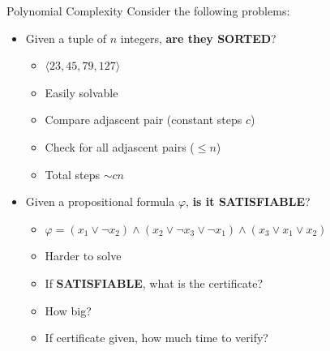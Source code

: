 \documentclass[usenames,dvipsnames]{beamer}
\newcommand\ldiaarg[1]{\langle#1\rangle}
\begin{document}
\begin{frame}{Polynomial Complexity}
    Consider the following problems:
    \begin{itemize}
        \item<1-> Given a tuple of $n$ integers, \textbf{are they SORTED}?
        \begin{itemize}
            \item<2-> $\ldiaarg{23,45,79,127}$
            \item<3-> Easily solvable
            \item<4-> Compare adjascent pair (constant steps $c$)
            \item<5-> Check for all adjascent pairs ($\leq n$)
            \item<6-> Total steps $\sim cn$
        \end{itemize}
        \item<7-> Given a propositional formula $\varphi$, \textbf{is it SATISFIABLE}?
        \begin{itemize}
            \item<8-> $\varphi = (x_1\vee \neg x_2)\wedge (x_2\vee \neg x_3\vee \neg x_1)\wedge (x_3\vee x_1\vee x_2)$
            \item<9-> Harder to solve
            \item<10-> If \textbf{SATISFIABLE}, what is the certificate?
            \item<11-> How big?
            \item<12-> If certificate given, how much time to verify?
        \end{itemize}
    \end{itemize}
\end{frame}
\end{document}
